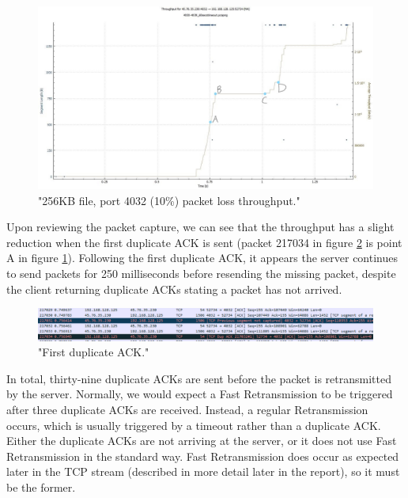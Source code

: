 \documentclass[12pt]{article}
\begin{document}
\begin{figure}[!htbp]
  \centering
  \includegraphics[scale=0.3]{4032_256KB_throughput-marked-points.jpg}
  \caption{"256KB file, port 4032 (10\%) packet loss throughput."}
  \label{figure1: 4032:256KB Throughput}
\end{figure}

Upon reviewing the packet capture, we can see that the throughput has a slight reduction when the first duplicate ACK is sent (packet 217034 in figure \ref{figure2: first duplicate ACK} is point A in figure \ref{figure1: 4032:256KB Throughput}).
Following the first duplicate ACK, it appears the server continues to send packets for 250 milliseconds before resending the missing packet, despite the client returning duplicate ACKs stating a packet has not arrived.

\begin{figure}[!htbp]
  \centering
  \includegraphics[width=\linewidth]{4032-256KB-duplicate-ack.PNG}
  \caption{"First duplicate ACK."}
  \label{figure2: first duplicate ACK}
\end{figure}

In total, thirty-nine duplicate ACKs are sent before the packet is retransmitted by the server.
Normally, we would expect a Fast Retransmission to be triggered after three duplicate ACKs are received.
Instead, a regular Retransmission occurs, which is usually triggered by a timeout rather than a duplicate ACK.
Either the duplicate ACKs are not arriving at the server, or it does not use Fast Retransmission in the standard way.
Fast Retransmission does occur as expected later in the TCP stream (described in more detail later in the report), so it must be the former.
\end{document}
